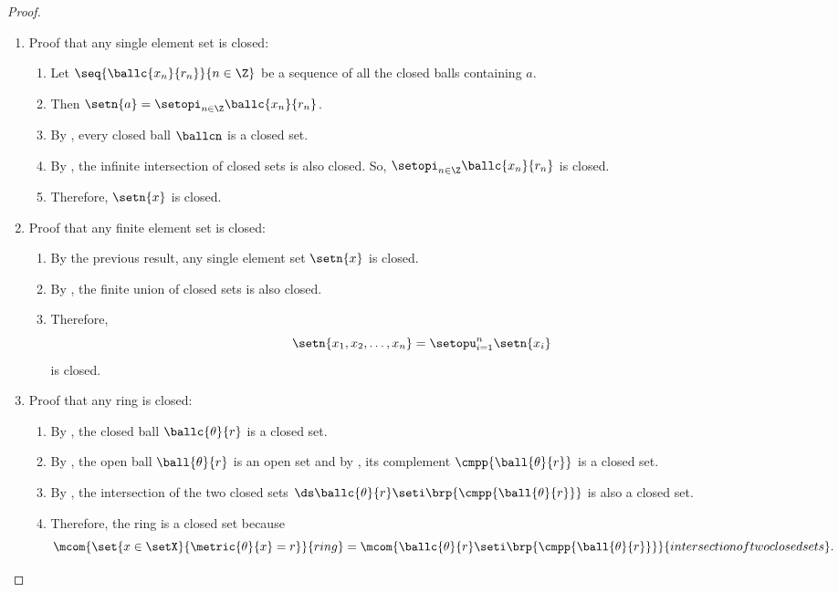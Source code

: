 \begin{proof}
\begin{enumerate}
  \item Proof that any single element set is closed:
    \begin{enumerate}
      \item Let $\seq{\ballc{x_n}{r_n}}{n\in\Z}$ be a sequence of all the closed balls containing $a$.
      \item Then $\setn{a} = \setopi_{n\in\Z} \ballc{x_n}{r_n}$.
      \item By , every closed ball $\ballcn$ is a closed set.
      \item By , the infinite intersection of closed sets is also closed.
            So, $\setopi_{n\in\Z} \ballc{x_n}{r_n}$ is closed.
      \item Therefore, $\setn{x}$ is closed.
    \end{enumerate}

  \item Proof that any finite element set is closed:
    \begin{enumerate}
      \item By the previous result, any single element set $\setn{x}$ is closed.
      \item By , the finite union of closed sets is also closed.
      \item Therefore, 
            \[ \setn{x_1,x_2,\ldots,x_n} = \setopu_{i=1}^n \setn{x_i} \]
            is closed.
    \end{enumerate}

  \item Proof that any ring is closed:
    \begin{enumerate}
      \item By , the closed ball $\ballc{\theta}{r}$ is a closed set.
      \item By , the open ball $\ball{\theta}{r}$ is an open set and
            by , its complement $\cmpp{\ball{\theta}{r}}$ is a closed set.
      \item By ,
            the intersection of the two closed sets   
            $\ds\ballc{\theta}{r} \seti \brp{\cmpp{\ball{\theta}{r}}}$
            is also a closed set.
      \item Therefore, the ring is a closed set because
        \[ \mcom{\set{x\in\setX}{\metric{\theta}{x}=r}}{ring} 
           = 
           \mcom{\ballc{\theta}{r} \seti \brp{\cmpp{\ball{\theta}{r}}}}{intersection of two closed sets}. 
        \]
    \end{enumerate}
\end{enumerate}
\end{proof}

